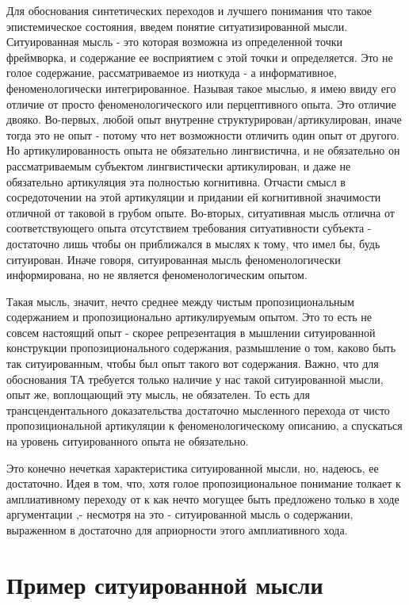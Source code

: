 \documentclass{article}
\begin{document}
Для обоснования синтетических переходов и лучшего понимания что такое эпистемическое состояния, введем понятие ситуатизированной мысли. Ситуированная мысль - это которая возможна из определенной точки фреймворка, и содержание ее восприятием с этой точки и определяется. Это не голое содержание, рассматриваемое из ниоткуда - а информативное, феноменологически интегрированное. Называя такое мыслью, я имею ввиду его отличие от просто феноменологического или перцептивного опыта. Это отличие двояко. Во-первых, любой опыт внутренне структурирован/артикулирован, иначе тогда это не опыт - потому что нет возможности отличить один опыт от другого. Но артикулированность опыта не обязательно лингвистична, и не обязательно он рассматриваемым субъектом лингвистически артикулирован, и даже не обязательно артикуляция эта полностью когнитивна. Отчасти смысл в сосредоточении на этой артикуляции и придании ей когнитивной значимости отличной от таковой в грубом опыте. Во-вторых, ситуативная мысль отлична от соответствующего опыта отсутствием требования ситуативности субъекта - достаточно лишь чтобы он приближался в мыслях к тому, что имел бы, будь ситуирован. Иначе говоря, ситуированная мысль феноменологически информирована, но не является феноменологическим опытом.

Такая мысль, значит, нечто среднее между чистым пропозициональным содержанием и пропозиционально артикулируемым опытом. Это то есть не совсем настоящий опыт - скорее репрезентация в мышлении ситуированной конструкции пропозиционального содержания, размышление о том, каково быть так ситуированным, чтобы был опыт такого вот содержания. Важно, что для обоснования ТА требуется только наличие у нас такой ситуированной мысли, опыт же, воплощающий эту мысль, не обязателен. То есть для трансцендентального доказательства достаточно мысленного перехода от чисто пропозициональной артикуляции к феноменологическому описанию, а спускаться на уровень ситуированного опыта не обязательно.

Это конечно нечеткая характеристика ситуированной мысли, но, надеюсь, ее достаточно. Идея в том, что, хотя голое пропозициональное понимание  толкает к амплиативному переходу от  к  как нечто могущее быть предложено только в ходе аргументации ,- несмотря на это - ситуированной мысль о содержании, выраженном в  достаточно для априорности этого амплиативного хода.

\section{Пример ситуированной мысли}
\end{document}
